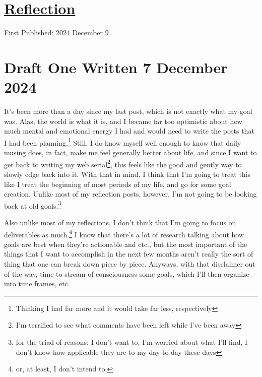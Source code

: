 \documentclass[12pt]{article}[titlepage]
\renewcommand{\,}{\textsuperscript{,}}
\begin{document}
\doublespacing
\section{\href{reflection-2024b.html}{Reflection}}
First Published: 2024 December 9

\section{Draft One Written 7 December 2024}

It's been more than a day since my last post, which is not exactly what my goal was.  
Alas, the world is what it is, and I became far too optimistic about how much mental and emotional energy I had and would need to write the posts that I had been planning.\footnote{Thinking I had far more and it would take far less, respectively}  
Still, I do know myself well enough to know that daily musing does, in fact, make me feel generally better about life, and since I want to get back to writing my web serial\footnote{I'm terrified to see what comments have been left while I've been away}, this feels like the good and gently way to slowly edge back into it.  
With that in mind, I think that I'm going to treat this like I treat the beginning of most periods of my life, and go for some goal creation.  
Unlike most of my reflection posts, however, I'm not going to be looking back at old goals.\footnote{for the triad of reasons: I don't want to, I'm worried about what I'll find, I don't know how applicable they are to my day to day these days}

Also unlike most of my reflections, I don't think that I'm going to focus on deliverables as much.\footnote{or, at least, I don't intend to.}  
I know that there's a lot of research talking about how goals are best when they're actionable and etc., but the most important of the things that I want to accomplish in the next few months aren't really the sort of thing that one can break down piece by piece.  
Anyways, with that disclaimer out of the way, time to stream of consciousness some goals, which I'll then organize into time frames, etc.
\end{document}
